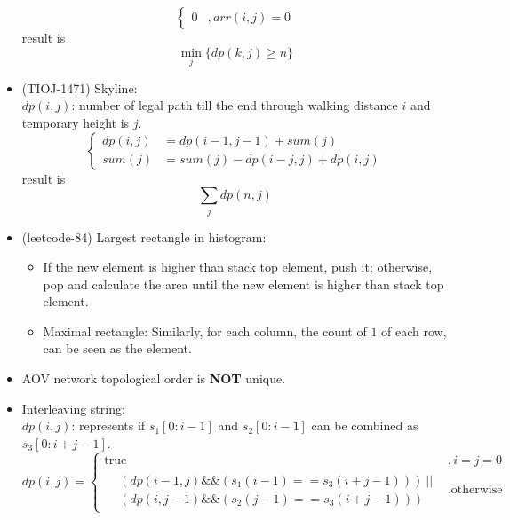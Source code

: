 \begin{itemize}
\begin{equation}
\begin{cases}
            0 &, arr(i, j) = 0
        \end{cases}
    \end{equation} result is \begin{equation}
        \min_{j} \{dp(k, j) \ge n\}
    \end{equation}
    \item (TIOJ-1471) Skyline: \\ 
    $dp(i, j)$: number of legal path till the end through walking distance $i$ and temporary height is $j$. \begin{equation}
        \begin{cases}
            dp(i, j) & = dp(i - 1, j - 1) + sum(j) \\
            sum(j) & = sum(j) - dp(i - j, j) + dp(i, j)
        \end{cases}
    \end{equation} result is \begin{equation}
        \sum_{j}dp(n, j)
    \end{equation}
    \item (leetcode-84) Largest rectangle in histogram: \begin{itemize}
        \item If the new element is higher than stack top element, push it; otherwise, pop and calculate the area until the new element is higher than stack top element.
        \item Maximal rectangle: Similarly, for each column, the count of $1$ of each row, can be seen as the element.
    \end{itemize}
    \item AOV network topological order is \textbf{NOT} unique.
    \item Interleaving string: \\
    $dp(i, j)$: represents if $s_1[0: i - 1]$ and $s_2[0: i - 1]$ can be combined as $s_3[0: i + j - 1]$. \begin{equation}
        dp(i, j) = \begin{cases}
            \text{true} &, i = j = 0 \\
            \begin{aligned}
                & (dp(i - 1, j) \&\& (s_1(i - 1) == s_3(i + j - 1))) \ || \\
                & (dp(i, j - 1) \&\& (s_2(j - 1) == s_3(i + j - 1)))
            \end{aligned} &, \text{otherwise}
        \end{cases}
    \end{equation}

\end{itemize}
